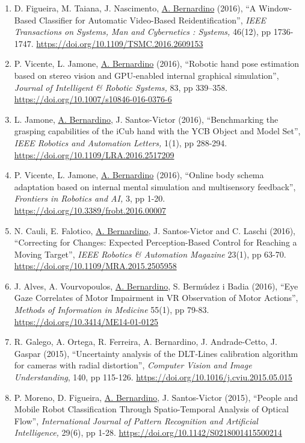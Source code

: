\documentclass[
]{article}
\begin{document}
\begin{enumerate}
\item
  D. Figueira, M. Taiana, J. Nascimento, \ul{A. Bernardino} (2016), ``A
  Window-Based Classifier for Automatic Video-Based Reidentification'',
  \emph{IEEE Transactions on Systems, Man and Cybernetics : Systems,}
  46(12), pp 1736-1747.
  \url{https://doi.org/10.1109/TSMC.2016.2609153}~~
\item
  P. Vicente, L. Jamone, \ul{A. Bernardino} (2016), ``Robotic hand pose
  estimation based on stereo vision and GPU-enabled internal graphical
  simulation'', \emph{Journal of Intelligent \& Robotic Systems,} 83, pp
  339--358. \url{https://doi.org/10.1007/s10846-016-0376-6}~
\item
  L. Jamone, \ul{A. Bernardino}, J. Santos-Victor (2016), ``Benchmarking
  the grasping capabilities of the iCub hand with the YCB Object and
  Model Set'', \emph{IEEE Robotics and Automation Letters,} 1(1), pp
  288-294. \url{https://doi.org/10.1109/LRA.2016.2517209}~
\item
  P. Vicente, L. Jamone, \ul{A. Bernardino} (2016), ``Online body schema
  adaptation based on internal mental simulation and multisensory
  feedback'', \emph{Frontiers in Robotics and AI,} 3, pp 1-20.
  \url{https://doi.org/10.3389/frobt.2016.00007}~
\item
  N. Cauli, E. Falotico, \ul{A. Bernardino}, J. Santos-Victor and C.
  Laschi (2016), ``Correcting for Changes: Expected Perception-Based
  Control for Reaching a Moving Target'', \emph{IEEE Robotics \&
  Automation Magazine} 23(1), pp 63-70.
  \url{https://doi.org/10.1109/MRA.2015.2505958}~
\item
  J. Alves, A. Vourvopoulos, \ul{A. Bernardino}, S. Bermúdez i Badia
  (2016), ``Eye Gaze Correlates of Motor Impairment in VR Observation of
  Motor Actions'', \emph{Methods of Information in Medicine} 55(1), pp
  79-83. \url{https://doi.org/10.3414/ME14-01-0125}~
\item
  R. Galego, A. Ortega, R. Ferreira, A. Bernardino, J. Andrade-Cetto, J.
  Gaspar (2015), ``Uncertainty analysis of the DLT-Lines calibration
  algorithm for cameras with radial distortion'', \emph{Computer Vision
  and Image Understanding}, 140, pp 115-126.
  \url{https://doi.org/10.1016/j.cviu.2015.05.015}
\item
  P. Moreno, D. Figueira, \ul{A. Bernardino}, J. Santos-Victor (2015),
  ``People and Mobile Robot Classification Through Spatio-Temporal
  Analysis of Optical Flow'', \emph{International Journal of Pattern
  Recognition and Artificial Intelligence,} 29(6), pp 1-28.
  \url{https://doi.org/10.1142/S0218001415500214}

\end{enumerate}
\end{document}

